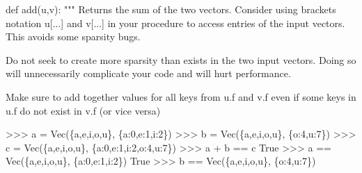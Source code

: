 \documentclass[
  letterpaper,
  DIV=11,
  numbers=noendperiod]{scrartcl}
\newenvironment{Shaded}{\begin{snugshade}}{\end{snugshade}}
\newcommand{\CommentTok}[1]{\textcolor[rgb]{0.37,0.37,0.37}{#1}}
\newcommand{\KeywordTok}[1]{\textcolor[rgb]{0.00,0.23,0.31}{#1}}
\newcommand{\NormalTok}[1]{\textcolor[rgb]{0.00,0.23,0.31}{#1}}
\begin{document}
\begin{Shaded}
\begin{Highlighting}[numbers=left,,]
\KeywordTok{def}\NormalTok{ add(u,v):}
    \CommentTok{"""}
\CommentTok{    Returns the sum of the two vectors.}
\CommentTok{    }
\CommentTok{    Consider using brackets notation u[...] and v[...] in your procedure}
\CommentTok{    to access entries of the input vectors.  This avoids some sparsity bugs.}

\CommentTok{    Do not seek to create more sparsity than exists in the two input vectors.}
\CommentTok{    Doing so will unnecessarily complicate your code and will hurt performance.}

\CommentTok{    Make sure to add together values for all keys from u.f and v.f even }
\CommentTok{    if some keys in u.f do not exist in v.f (or vice versa)}

\CommentTok{    \textgreater{}\textgreater{}\textgreater{} a = Vec(\{\textquotesingle{}a\textquotesingle{},\textquotesingle{}e\textquotesingle{},\textquotesingle{}i\textquotesingle{},\textquotesingle{}o\textquotesingle{},\textquotesingle{}u\textquotesingle{}\}, \{\textquotesingle{}a\textquotesingle{}:0,\textquotesingle{}e\textquotesingle{}:1,\textquotesingle{}i\textquotesingle{}:2\})}
\CommentTok{    \textgreater{}\textgreater{}\textgreater{} b = Vec(\{\textquotesingle{}a\textquotesingle{},\textquotesingle{}e\textquotesingle{},\textquotesingle{}i\textquotesingle{},\textquotesingle{}o\textquotesingle{},\textquotesingle{}u\textquotesingle{}\}, \{\textquotesingle{}o\textquotesingle{}:4,\textquotesingle{}u\textquotesingle{}:7\})}
\CommentTok{    \textgreater{}\textgreater{}\textgreater{} c = Vec(\{\textquotesingle{}a\textquotesingle{},\textquotesingle{}e\textquotesingle{},\textquotesingle{}i\textquotesingle{},\textquotesingle{}o\textquotesingle{},\textquotesingle{}u\textquotesingle{}\}, \{\textquotesingle{}a\textquotesingle{}:0,\textquotesingle{}e\textquotesingle{}:1,\textquotesingle{}i\textquotesingle{}:2,\textquotesingle{}o\textquotesingle{}:4,\textquotesingle{}u\textquotesingle{}:7\})}
\CommentTok{    \textgreater{}\textgreater{}\textgreater{} a + b == c}
\CommentTok{    True}
\CommentTok{    \textgreater{}\textgreater{}\textgreater{} a == Vec(\{\textquotesingle{}a\textquotesingle{},\textquotesingle{}e\textquotesingle{},\textquotesingle{}i\textquotesingle{},\textquotesingle{}o\textquotesingle{},\textquotesingle{}u\textquotesingle{}\}, \{\textquotesingle{}a\textquotesingle{}:0,\textquotesingle{}e\textquotesingle{}:1,\textquotesingle{}i\textquotesingle{}:2\})}
\CommentTok{    True}
\CommentTok{    \textgreater{}\textgreater{}\textgreater{} b == Vec(\{\textquotesingle{}a\textquotesingle{},\textquotesingle{}e\textquotesingle{},\textquotesingle{}i\textquotesingle{},\textquotesingle{}o\textquotesingle{},\textquotesingle{}u\textquotesingle{}\}, \{\textquotesingle{}o\textquotesingle{}:4,\textquotesingle{}u\textquotesingle{}:7\})}

\end{Highlighting}
\end{Shaded}
\end{document}
